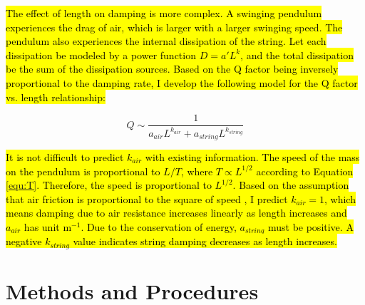 \documentclass[12pt]{article}
\DeclareRobustCommand{\hlnew}[1]{{\sethlcolor{hlcnew}\hl{#1}}}
\begin{document}
\hlnew{The effect of length on damping is more complex. A swinging pendulum experiences the drag of air, which is larger with a larger swinging speed. The pendulum also experiences the internal dissipation of the string. {\cite{pbm2001}} Let each dissipation be modeled by a power function $D=a'L^k$, and the total dissipation be the sum of the dissipation sources. Based on the Q factor being inversely proportional to the damping rate, I develop the following model for the Q factor vs. length relationship:}

\begin{equation}
\label{equ:q-length}
Q \sim \frac{1}{a_{air}L^{k_{air}}+a_{string}L^{k_{string}}}
\end{equation}

\hlnew{It is not difficult to predict $k_{air}$ with existing information. The speed of the mass on the pendulum is proportional to $L/T$, where $T\propto L^{1/2}$ according to Equation {\ref{equ:T}}. Therefore, the speed is proportional to $L^{1/2}$. Based on the assumption that air friction is proportional to the square of speed {\cite{quadratic-damp}}, I predict $k_{air}=1$, which means damping due to air resistance increases linearly as length increases and $a_{air}$ has unit $\mathrm{m}^{-1}$. Due to the conservation of energy, $a_{string}$ must be positive. A negative $k_{string}$ value indicates string damping decreases as length increases.}


\section{Methods and Procedures}
\end{document}
